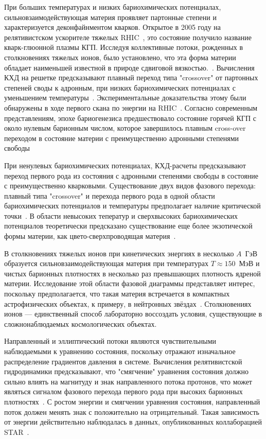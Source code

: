 При больших температурах и низких бариохимических потенциалах, сильновзаимодействующая материя проявляет партонные степени и характеризуется деконфайнментом кварков. 
Открытое в 2005 году на релятивистском ускорителе тяжелых RHIC~\cite{STAR:2005gfr}, это состояние получило название кварк-глюонной плазмы КГП.
Исследуя коллективные потоки, рожденных в столкновениях тяжелых ионов, было установлено, что эта форма материи обладает наименьшей известной в природе сдвиговой вязкостью.~\cite{Shen:2015msa}.
Вычисления КХД на решетке предсказывают плавный переход типа "crossover" от партонных степеней своды к адронным, при низких бариохимических потенциалах с уменьшением температуры~\cite{HotQCD:2014kol, Karsch:2003va}.
Экспериментальные доказательства этому были обнаружены в ходе первого скана по энергии на RHIC~\cite{Odyniec:2019kfh}.
Согласно современным представлениям, эпохе бариогенезиса предшествовало состояние горячей КГП с около нулевым барионным числом, которое завершилось плавным cross-over переходом в состояние материи с преимущественно адронными степенями свободы~\cite{Esumi:2022uas}

При ненулевых бариохимических потенциалах, КХД-расчеты предсказывают переход первого рода из состояния с адронными степенями свободы в состояние с преимущественно кварковыми.
Существование двух видов фазового перехода: плавный типа "crossover" и перехода первого рода в одной области бариохимических потенциалов и температуры предполагает наличие критической точки~\cite{Odyniec:2019kfh}.
В области невысоких теператур и сверхвысоких бариохимических потенциалов теоретически предсказано существование еще более экзотической формы материи, как цвето-сверхпроводящая материя~\cite{McLerran:2008ux}.

В столкновениях тяжелых ионов при кинетических энергиях в несколько $A$~ГэВ образуется сильновзаимодействующая материя при температурах $T\approx150$~МэВ и чистых барионных плотностях в несколько раз превышающих плотность ядреной материи.
Исследование этой области фазовой диаграммы представляет интерес, поскольку предполагается, что такая материя встречается в компактных астрофизических объектах, к примеру, в нейтронных звёздах~\cite{Danielewicz:2002pu}.
Столкновениях ионов --- единственный способ лабораторно воссоздать условия, существующие в сложнонаблюдаемых космологических объектах.

Направленный и эллиптический потоки являются чувствительными наблюдаемыми к уравнению состояния, поскольку отражают изначальное распределение градиентов давления в системе.
Вычисления релятивистской гидродинамики предсказывают, что "смягчение" уравнения состояния должно сильно влиять на магнитуду и знак направленного потока протонов, что может являться сигналом фазового перехода первого рода при высоких барионных плотностях~\cite{Rischke:1995pe, Stoecker:2004qu}.
С ростом энергии и смягчении уравнения состояния, направленный поток должен менять знак с положительно на отрицательный.
Такая зависимость от энергии действительно наблюдалась в данных, опубликованных коллаборацией STAR~\cite{STAR:2014clz}.

